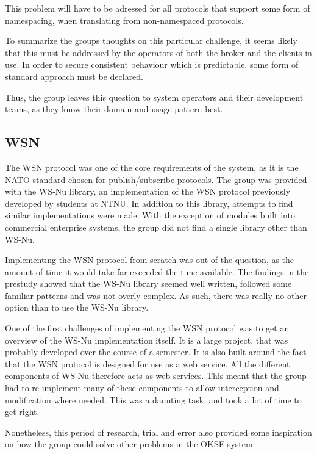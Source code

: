This problem will have to be adressed for all protocols that support some form of namespacing, when translating from non-namespaced protocols.

To summarize the groups thoughts on this particular challenge, it seems likely that this must be addressed by the operators of both the broker and the clients in use. In order to secure consistent behaviour which is predictable, some form of standard approach must be declared.

Thus, the group leaves this question to system operators and their development teams, as they know their domain and usage pattern best.

\subsection{WSN}
\label{subsec:evaluation-implementation-wsn}

The WSN protocol was one of the core requirements of the system, as it is the NATO standard chosen for publish/subscribe protocols. The group was provided with the WS-Nu library, an implementation of the WSN protocol previously developed by students at NTNU. In addition to this library, attempts to find similar implementations were made. With the exception of modules built into commercial enterprise systems, the group did not find a single library other than WS-Nu.

Implementing the WSN protocol from scratch was out of the question, as the amount of time it would take far exceeded the time available. The findings in the prestudy showed that the WS-Nu library seemed well written, followed some familiar patterns and was not overly complex. As such, there was really no other option than to use the WS-Nu library.

One of the first challenges of implementing the WSN protocol was to get an overview of the WS-Nu implementation itself. It is a large project, that was probably developed over the course of a semester. It is also built around the fact that the WSN protocol is designed for use as a web service. All the different components of WS-Nu therefore acts as web services. This meant that the group had to re-implement many of these components to allow interception and modification where needed. This was a daunting task, and took a lot of time to get right.

Nonetheless, this period of research, trial and error also provided some inspiration on how the group could solve other problems in the OKSE system.

